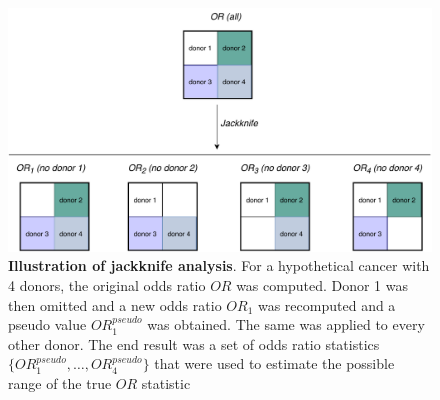 \begin{figure}[h!]
    \centering
    \includegraphics[scale=0.8]{graphics/jackknife_demo.pdf}
    \caption{\textbf{Illustration of jackknife analysis}. For a hypothetical cancer with 4 donors, the original odds ratio $OR$ was computed. Donor 1 was then omitted and a new odds ratio $OR_1$ was recomputed and a pseudo value $OR^{pseudo}_1$ was obtained. The same was applied to every other donor. The end result was a set of odds ratio statistics $\{OR_1^{pseudo}, \ldots, OR_4^{pseudo}\}$ that were used to estimate the possible range of the true $OR$ statistic}
    \label{fig:jackknife_demo}
\end{figure}
